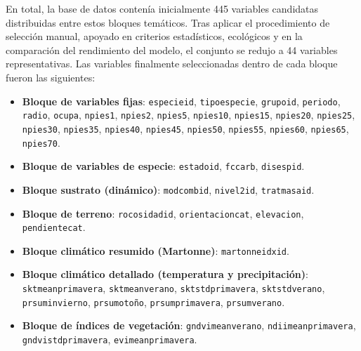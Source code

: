 En total, la base de datos contenía inicialmente 445 variables candidatas distribuidas entre estos bloques temáticos. Tras aplicar el procedimiento de selección manual, apoyado en criterios estadísticos, ecológicos y en la comparación del rendimiento del modelo, el conjunto se redujo a 44 variables representativas. Las variables finalmente seleccionadas dentro de cada bloque fueron las siguientes:

{%
\renewcommand{\_}{\textunderscore\discretionary{}{}{}}%
\begin{itemize}
    \item \textbf{Bloque de variables fijas}:
          \texttt{especie\_id}, \texttt{tipo\_especie}, \texttt{grupo\_id}, \texttt{periodo}, \texttt{radio}, \texttt{ocupa},
          \texttt{npies\_1}, \texttt{npies\_2}, \texttt{npies\_5},
          \texttt{npies\_10}, \texttt{npies\_15}, \texttt{npies\_20},
          \texttt{npies\_25}, \texttt{npies\_30}, \texttt{npies\_35},
          \texttt{npies\_40}, \texttt{npies\_45}, \texttt{npies\_50},
          \texttt{npies\_55}, \texttt{npies\_60}, \texttt{npies\_65},
          \texttt{npies\_70}.

    \item \textbf{Bloque de variables de especie}:
          \texttt{estado\_id}, \texttt{fccarb}, \texttt{disesp\_id}.

    \item \textbf{Bloque sustrato (dinámico)}:
          \texttt{modcomb\_id}, \texttt{nivel2\_id},
          \texttt{tratmasa\_id}.

    \item \textbf{Bloque de terreno}:
          \texttt{rocosidad\_id},
          \texttt{orientacion\_cat}, \texttt{elevacion}, \texttt{pendiente\_cat}.

    \item \textbf{Bloque climático resumido (Martonne)}:
          \texttt{martonneidx\_id}.

    \item \textbf{Bloque climático detallado (temperatura y precipitación)}:
          \texttt{skt\_mean\_primavera}, \texttt{skt\_mean\_verano},
          \texttt{skt\_std\_primavera}, \texttt{skt\_std\_verano},
          \texttt{pr\_sum\_invierno}, \texttt{pr\_sum\_otoño},
          \texttt{pr\_sum\_primavera}, \texttt{pr\_sum\_verano}.

    \item \textbf{Bloque de índices de vegetación}:
          \texttt{gndvi\_mean\_verano}, \texttt{ndii\_mean\_primavera},
          \texttt{gndvi\_std\_primavera}, \texttt{evi\_mean\_primavera}.
\end{itemize}
}%

